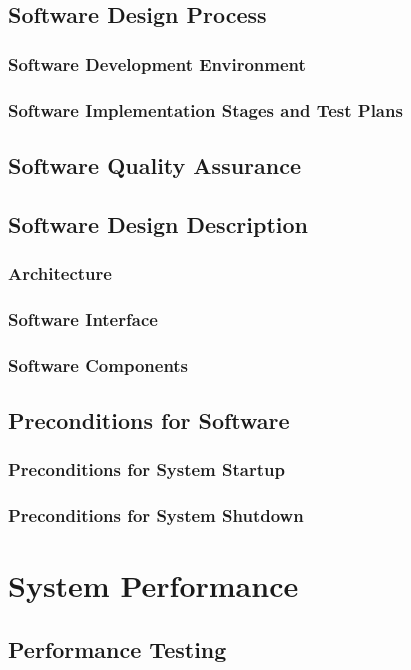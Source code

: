 \documentclass[10pt,a4paper]{report}
\begin{document}
\section{Software Design Process}
\subsection{Software Development Environment}
\subsection{Software Implementation Stages and Test Plans}

\section{Software Quality Assurance}

\section{Software Design Description}
\subsection{Architecture}
\subsection{Software Interface}
\subsection{Software Components}

\section{Preconditions for Software}
\subsection{Preconditions for System Startup}
\subsection{Preconditions for System Shutdown}

\chapter{System Performance}
\section{Performance Testing}
\end{document}
